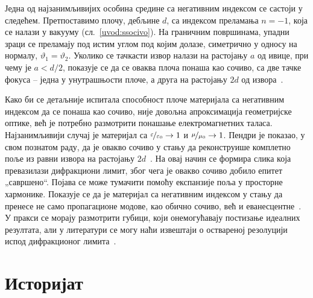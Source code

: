 \documentclass[main.tex]{subfiles}
\begin{document}
Једна од најзанимљивијих особина средине са негативним индексом се састоји у следећем. Претпоставимо плочу, дебљине $d$, са индексом преламања $n=-1$, која се налази у вакууму (сл.~\ref{uvod:ssocivo}). На граничним површинама, упадни зраци се преламају под истим углом под којим долазе, симетрично у односу на нормалу, $\vartheta_1 = \vartheta_2$. Уколико се тачкасти извор налази на растојању $a$ од ивице, при чему је $a<d/2$, показује се да се оваква плоча понаша као сочиво, са две тачке фокуса -- једна у унутрашњости плоче, а друга на растојању $2d$ од извора~\cite{veselago_cir}.

Како би се детаљније испитала способност плоче материјала са негативним индексом да се понаша као сочиво, није довољна апроксимација геометријске оптике, већ је потребно размотрити понашање електромагнетних таласа. Најзанимљивији случај је материјал са $\nicefrac{\varepsilon}{\varepsilon_0}\to 1$ и $\nicefrac{\mu}{\mu_0}\to 1$. Пендри је показао, у свом познатом раду, да је овакво сочиво у стању да реконструише комплетно поље из равни извора на растојању $2d$~\cite{pendry3}. На овај начин се формира слика која превазилази дифракциони лимит, због чега је овакво сочиво добило епитет „савршено``. Појава се може тумачити помоћу експанзије поља у просторне хармонике. Показује се да је материјал са негативним индексом у стању да пренесе не само пропагационе модове, као обично сочиво, већ и еванесцентне~\cite{markes_knjiga}. У пракси се морају размотрити губици, који онемогућавају постизање идеалних резултата, али у литератури се могу наћи извештаји о оствареној резолуцији испод дифракционог лимита~\cite{grbic2004overcoming}.

\section{Историјат}
\end{document}
